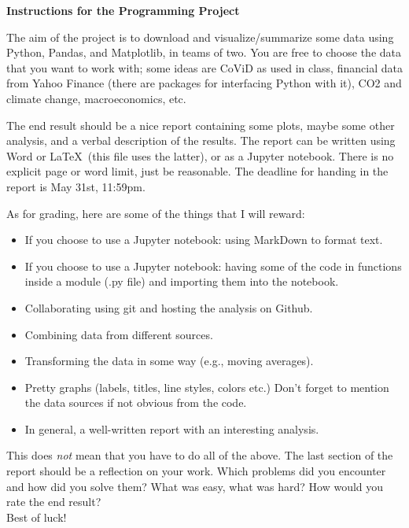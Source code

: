 \documentclass[11pt,a4paper]{article}
\begin{document}
\begin{center}
\bfseries\huge Instructions for the Programming Project
\end{center}
The aim of the project is to download and visualize/summarize some data using Python, Pandas, and Matplotlib, in teams of two. You are free to choose the data that you want to work with; some ideas are CoViD as used in class, financial data from Yahoo Finance (there are packages for interfacing Python with it), CO2 and climate change, macroeconomics, etc.

The end result should be a nice report containing some plots, maybe some other analysis, and a verbal description of the results. The report can be written using Word or \LaTeX\ (this file uses the latter), or as a Jupyter notebook. There is no explicit page or word limit, just be reasonable. The deadline for handing in the report is May 31st, 11:59pm.

As for grading, here are some of the things that I will reward:
\begin{itemize}
\item If you choose to use a Jupyter notebook: using MarkDown to format text.
\item If you choose to use a Jupyter notebook: having some of the code in functions inside a module (.py file) and importing them into the notebook.
\item Collaborating using git and hosting the analysis on Github.
\item Combining data from different sources.
\item Transforming the data in some way (e.g., moving averages).
\item Pretty graphs (labels, titles, line styles, colors etc.) Don't forget to mention the data sources if not obvious from the code.
\item In general, a well-written report with an interesting analysis.
\end{itemize}
This does \emph{not} mean that you have to do all of the above. The last section of the report should be a reflection on your work. Which problems did you encounter and how did you solve them? What was easy, what was hard? How would you rate the end result?\\
\noindent
Best of luck!
\end{document}
